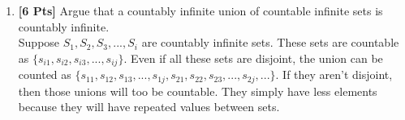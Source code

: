 \documentclass[11pt]{article}
\begin{document}
\begin{enumerate}
        \item {\bf [6 Pts]} Argue that a countably infinite union of countable infinite sets is countably infinite. \\
        Suppose $S_1, S_2, S_3, ..., S_i$ are countably infinite sets. These sets are countable as $\{ s_{i1}, s_{i2}, s_{i3}, ..., s_{ij} \} $. Even if all these sets are disjoint, the union can be counted as $\{ s_{11}, s_{12}, s_{13}, ..., s_{1j}, s_{21}, s_{22}, s_{23}, ..., s_{2j}, ...\} $. If they aren't disjoint, then those unions will too be countable. They simply have less elements because they will have repeated values between sets.

    \end{enumerate}
\end{document}
